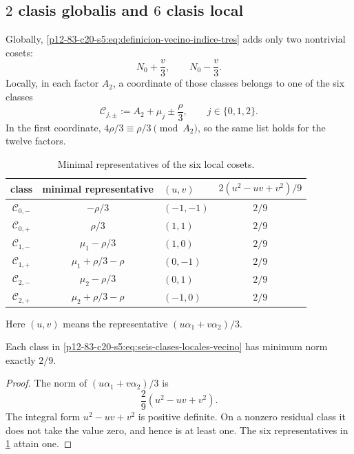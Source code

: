 \subsection{\(2\) clasis globalis and \(6\) clasis local}

Globally, \eqref{p12-83-c20-s5:eq:definicion-vecino-indice-tres} adds only two nontrivial
cosets:
\[
 N_0+\frac v3,
 \qquad
 N_0-\frac v3.
\]
Locally, in each factor \(A_2\), a coordinate of those classes belongs to one of the six classes
\begin{equation}
 \mathscr C_{j,\pm}
 :=A_2+\mu_j\pm\frac\rho3,
 \qquad j\in\{0,1,2\}.
 \label{p12-83-c20-s5:eq:seis-clases-locales-vecino}
\end{equation}
In the first coordinate, \(4\rho/3\equiv\rho/3\pmod{A_2}\), so
the same list holds for the twelve factors.

\begin{table}[htbp]
\centering
\caption{Minimal representatives of the six local cosets.}
\label{p12-83-c20-s5:tab:seis-clases-locales-vecino}
\begin{tabular}{cclc}
\toprule
class&minimal representative&\((u,v)\)&
\(2(u^2-uv+v^2)/9\)\\
\midrule
\(\mathscr C_{0,-}\)&\(-\rho/3\)&\((-1,-1)\)&\(2/9\)\\
\(\mathscr C_{0,+}\)&\( \rho/3\)&\((1,1)\)&\(2/9\)\\
\(\mathscr C_{1,-}\)&\( \mu_1-\rho/3\)&\((1,0)\)&\(2/9\)\\
\(\mathscr C_{1,+}\)&\( \mu_1+\rho/3-\rho\)&\((0,-1)\)&\(2/9\)\\
\(\mathscr C_{2,-}\)&\( \mu_2-\rho/3\)&\((0,1)\)&\(2/9\)\\
\(\mathscr C_{2,+}\)&\( \mu_2+\rho/3-\rho\)&\((-1,0)\)&\(2/9\)\\
\bottomrule
\end{tabular}
\end{table}

Here \((u,v)\) means the representative
\((u\alpha_1+v\alpha_2)/3\).

\begin{lemma}
\label{p12-83-c20-s5:lem:minimo-seis-clases-locales}
Each class in \eqref{p12-83-c20-s5:eq:seis-clases-locales-vecino} has minimum norm
exactly \(2/9\).
\end{lemma}

\begin{proof}
The norm of \((u\alpha_1+v\alpha_2)/3\) is
\[
 \frac29(u^2-uv+v^2).
\]
The integral form \(u^2-uv+v^2\) is positive definite. On a nonzero
residual class it does not take the value zero, and hence is at least one. The six
representatives in \cref{p12-83-c20-s5:tab:seis-clases-locales-vecino} attain one.
\end{proof}

